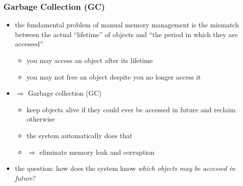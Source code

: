 \documentclass[12pt,dvipdfmx]{beamer}
\newcommand{\ao}[1]{{\color{blue}#1}}
\begin{document}
\begin{frame}
\frametitle{Garbage Collection (GC)}
\begin{itemize}
\item the fundamental problem of manual memory management is
  the mismatch between the actual ``lifetime'' of objects
  and ``the period in which they are accessed''
  \begin{itemize}
  \item you may access an object after its lifetime
  \item you may not free an object despite you no longer access it
  \end{itemize}

\item<2-> $\Rightarrow$ \ao{Garbage collection (GC)}
  \begin{itemize}
  \item \ao{keep objects alive if they could ever be accessed in future
      and reclaim otherwise}
  \item the system automatically does that
  \item $\Rightarrow$ eliminate memory leak and corruption
  \end{itemize}
\item<3-> \ao{the question:} how does the system know
  \ao{\it which objects may be accessed in future}?
\end{itemize}
\end{frame}
\fi
\end{document}
